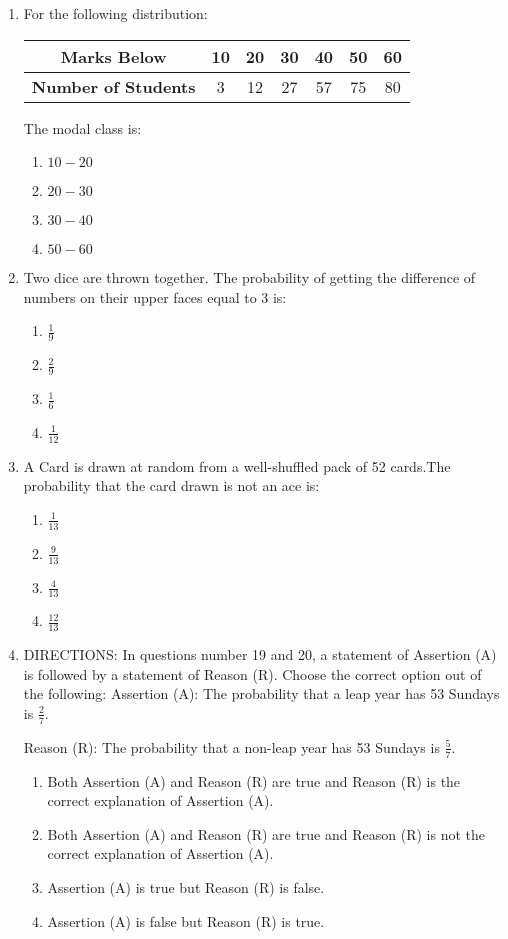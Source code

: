 \begin{enumerate}
\item For the following distribution:

\begin{center}
\begin{tabular}{|c|c|c|c|c|c|c|}
\hline
\textbf{Marks Below} & 10 & 20 & 30 & 40 & 50 & 60 \\
\hline
\textbf{Number of Students} & 3 & 12 & 27 & 57 & 75 & 80 \\
\hline
\end{tabular}
\end{center}

The modal class is:

\begin{enumerate}
    \item $10-20$
    \item $20-30$
    \item $30-40$
    \item $50-60$
\end{enumerate}
\item  Two dice are thrown together. The probability of getting the difference of numbers on their upper faces equal to 3 is:

	\begin{enumerate}
	\item  $\frac{1}{9}$
	\item $\frac{2}{9}$
	\item  $\frac{1}{6}$
	\item  $\frac{1}{12}$
\end{enumerate}
\item A Card is drawn at random from a well-shuffled pack of 52 cards.The probability that the card drawn is not an ace is:
\begin{enumerate}
	\item $\frac{1}{13}$
	\item  $\frac{9}{13}$
	\item $\frac{4}{13}$
	\item $\frac{12}{13}$
\end{enumerate}
\item{DIRECTIONS:} In questions number 19 and 20, a statement of Assertion (A) is followed by a statement of Reason (R). Choose the correct option out of the following:
Assertion (A): The probability that a leap year has 53 Sundays is $\frac{2}{7}$.

Reason (R): The probability that a non-leap year has 53 Sundays is $\frac{5}{7}$.

\begin{enumerate}
    \item Both Assertion (A) and Reason (R) are true and Reason (R) is the correct explanation of Assertion (A).
    \item Both Assertion (A) and Reason (R) are true and Reason (R) is not the correct explanation of Assertion (A).
    \item Assertion (A) is true but Reason (R) is false.
    \item Assertion (A) is false but Reason (R) is true.
\end{enumerate}



\end{enumerate}
